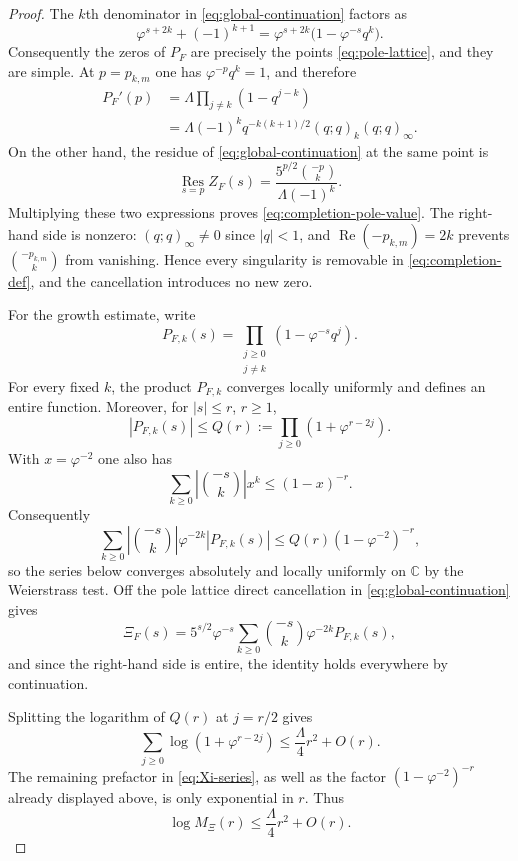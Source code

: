 \documentclass[10pt,a4paper]{amsart}
\newcommand{\Ree}{\operatorname{Re}}
\newcommand{\ZF}{Z_F}
\begin{document}
\begin{proof}
The $k$th denominator in \eqref{eq:global-continuation} factors as
\[
\varphi^{s+2k}+(-1)^{k+1}
=\varphi^{s+2k}\bigl(1-\varphi^{-s}q^k\bigr).
\]
Consequently the zeros of $P_F$ are precisely the points \eqref{eq:pole-lattice}, and they are simple.  At $p=p_{k,m}$ one has $\varphi^{-p}q^k=1$, and therefore
\begin{align*}
P_F'(p)
&=\Lambda\prod_{j\ne k}(1-q^{j-k})\\
&=\Lambda(-1)^kq^{-k(k+1)/2}(q;q)_k(q;q)_\infty.
\end{align*}
On the other hand, the residue of \eqref{eq:global-continuation} at the same point is
\[
\operatorname*{Res}_{s=p}\ZF(s)
=\frac{5^{p/2}\binom{-p}{k}}
{\Lambda(-1)^k}.
\]
Multiplying these two expressions proves \eqref{eq:completion-pole-value}.  The right-hand side is nonzero: $(q;q)_\infty\ne0$ since $|q|<1$, and $\Ree(-p_{k,m})=2k$ prevents $\binom{-p_{k,m}}{k}$ from vanishing.  Hence every singularity is removable in \eqref{eq:completion-def}, and the cancellation introduces no new zero.

For the growth estimate, write
\[
P_{F,k}(s)=\prod_{\substack{j\ge0\\j\ne k}}
(1-\varphi^{-s}q^j).
\]
For every fixed $k$, the product $P_{F,k}$ converges locally uniformly and defines an entire function.  Moreover, for $|s|\le r$, $r\ge1$,
\[
|P_{F,k}(s)|
\le Q(r):=\prod_{j\ge0}(1+\varphi^{r-2j}).
\]
With $x=\varphi^{-2}$ one also has
\[
\sum_{k\ge0}\left|\binom{-s}{k}\right|x^k
\le (1-x)^{-r}.
\]
Consequently
\[
\sum_{k\ge0}\left|\binom{-s}{k}\right|\varphi^{-2k}|P_{F,k}(s)|
\le Q(r)(1-\varphi^{-2})^{-r},
\]
so the series below converges absolutely and locally uniformly on $\mathbb C$ by the Weierstrass test.  Off the pole lattice direct cancellation in \eqref{eq:global-continuation} gives
\begin{equation}\label{eq:Xi-series}
\Xi_F(s)
=5^{s/2}\varphi^{-s}
\sum_{k\ge0}\binom{-s}{k}\varphi^{-2k}P_{F,k}(s),
\end{equation}
and since the right-hand side is entire, the identity holds everywhere by continuation.

Splitting the logarithm of $Q(r)$ at $j=r/2$ gives
\begin{equation}\label{eq:qproduct-growth}
\sum_{j\ge0}\log(1+\varphi^{r-2j})
\le \frac{\Lambda}{4}r^2+O(r).
\end{equation}
The remaining prefactor in \eqref{eq:Xi-series}, as well as the factor $(1-\varphi^{-2})^{-r}$ already displayed above, is only exponential in $r$.  Thus
\[
\log M_\Xi(r)\le \frac{\Lambda}{4}r^2+O(r).
\]


\end{proof}
\end{document}
